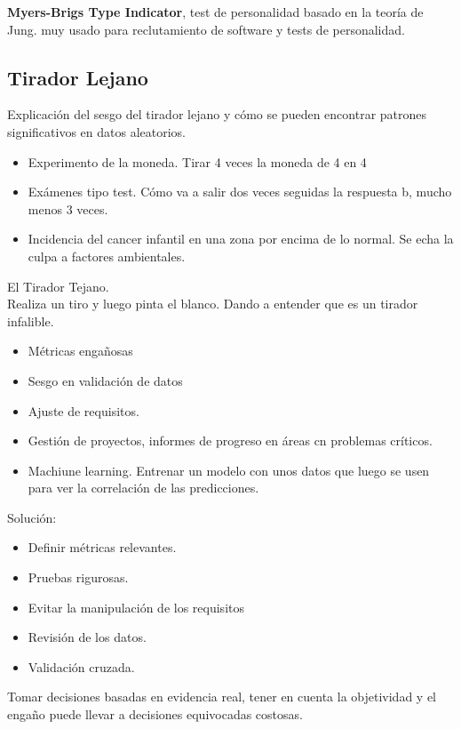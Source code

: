 \documentclass[12pt, a4paper, twoside]{article}
\begin{document}
\textbf{Myers-Brigs Type Indicator}, test de personalidad basado en la teoría de Jung. muy usado para
reclutamiento de software y tests de personalidad.\\

\subsection{Tirador Lejano}
Explicación del sesgo del tirador lejano y cómo se pueden encontrar patrones significativos en datos aleatorios.
\begin{itemize}
    \item Experimento de la moneda. Tirar 4 veces la moneda de 4 en 4 
    \item Exámenes tipo test. Cómo va a salir dos veces seguidas la respuesta b, mucho menos 3 veces.
    \item Incidencia del cancer infantil en una zona por encima de lo normal. Se echa la culpa a factores ambientales.
\end{itemize}

El Tirador Tejano.\\

Realiza un tiro y luego pinta el blanco. Dando a entender que es un tirador infalible.

\begin{itemize}
    \item Métricas engañosas
    \item Sesgo en validación de datos
    \item Ajuste de requisitos.
    \item Gestión de proyectos, informes de progreso en áreas cn problemas críticos.
    \item Machiune learning. Entrenar un modelo con unos datos que luego se usen para ver la correlación de las predicciones.
\end{itemize}

Solución:

\begin{itemize}
    \item Definir métricas relevantes.
    \item Pruebas rigurosas.
    \item Evitar la manipulación de los requisitos
    \item Revisión de los datos.
    \item Validación cruzada.
\end{itemize}

Tomar decisiones basadas en evidencia real, tener en cuenta la objetividad y el engaño puede llevar a decisiones equivocadas costosas.
\end{document}
